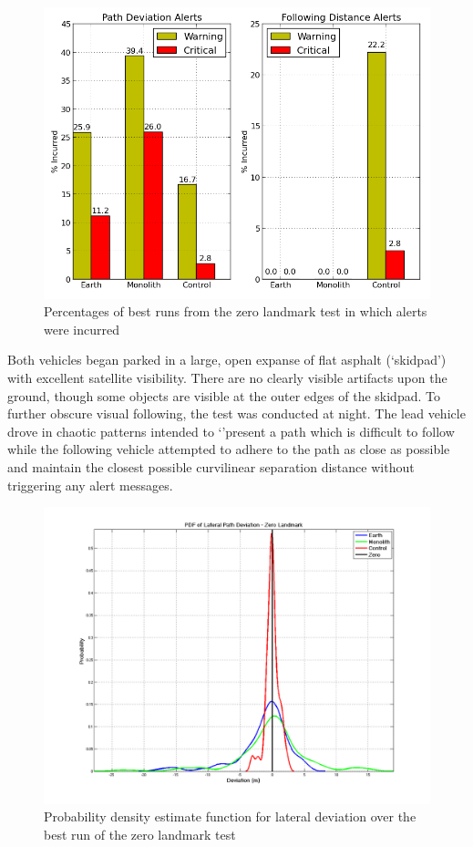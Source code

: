 \documentclass[twocolumn,10pt]{article}
\begin{document}
    \begin{figure}[ht] \centering
      \includegraphics[width=\columnwidth]{../graphics/zero_landmark_alert_percents.png}
      \caption{Percentages of best runs from the zero landmark test in which alerts were incurred}
      \label{fig:zero_landmark_alert_percents}
    \end{figure}

    Both vehicles began parked in a large, open expanse of flat asphalt (`skidpad') with excellent satellite visibility.  There are no clearly visible artifacts upon the ground, though some objects are visible at the outer edges of the skidpad.  To further obscure visual following, the test was conducted at night.  The lead vehicle drove in chaotic patterns intended to `'present a path which is difficult to follow while the following vehicle attempted to adhere to the path as close as possible and maintain the closest possible curvilinear separation distance without triggering any alert messages.

    \begin{figure}[ht] \centering
      \includegraphics[width=\columnwidth]{../graphics/pdf_zero_landmark_deviation.png}
      \caption{Probability density estimate function for lateral deviation over the best run of the zero landmark test}
      \label{fig:pdf_zl_dev}
    \end{figure}
\end{document}
